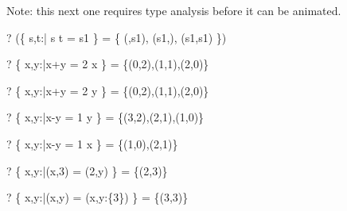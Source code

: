 \documentclass{article}
\begin{document}
Note: this next one requires type analysis before it can be animated.
\begin{zed}
  \vdash? (\{ s,t:\power \nat | s \cup t = s1 \} 
       = \{ (\emptyset,s1), (s1,\emptyset), (s1,s1) \})
\end{zed}

\begin{zed}
  \vdash? \{ x,y:\nat|x+y = 2 \land x  \} = \{(0,2),(1,1),(2,0)\}
\end{zed}
\begin{zed}
  \vdash? \{ x,y:\nat|x+y = 2 \land y  \} = \{(0,2),(1,1),(2,0)\}
\end{zed}
\begin{zed}
  \vdash? \{ x,y:\nat|x-y = 1  \geq y \} = \{(3,2),(2,1),(1,0)\}
\end{zed}
\begin{zed}
  \vdash? \{ x,y:\nat|x-y = 1  \geq x \} = \{(1,0),(2,1)\}
\end{zed}
\begin{zed}
  \vdash? \{ x,y:\nat|(x,3) = (2,y) \} = \{(2,3)\}
\end{zed}
\begin{zed}
  \vdash? \{ x,y:\nat|(x,y) = (\mu x,y:\{3\}) \} = \{(3,3)\}
\end{zed}
\end{document}
